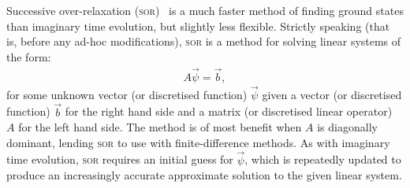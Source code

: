 Successive over-relaxation (\textsc{sor})~\cite{young_iterative_1950} is a much faster method of finding ground states than imaginary time evolution, but slightly less flexible. Strictly speaking (that is, before any ad-hoc modifications), \textsc{sor} is a method for solving linear systems of the form:
\begin{align}\label{eq:linear_system_SOR}
A \vec \psi = \vec b,
\end{align} 
for some unknown vector (or discretised function) $\vec \psi$ given a vector (or discretised function) $\vec b$ for the right hand side and a  matrix (or discretised linear operator) $A$ for the left hand side. The method is of most benefit when $A$ is diagonally dominant, lending \textsc{sor} to use with finite-difference methods. As with imaginary time evolution, \textsc{sor} requires an initial guess for $\vec\psi$, which is repeatedly updated to produce an increasingly accurate approximate solution to the given linear system.

